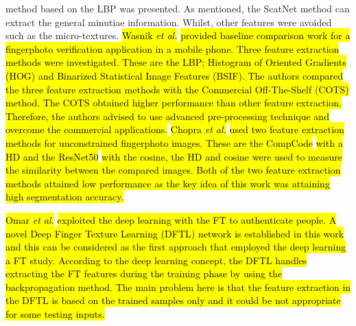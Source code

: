 \documentclass[review]{elsarticle}
\begin{document}
method based on the LBP was presented. As mentioned, the ScatNet method can extract the general minutiae information. Whilst, other features were avoided such as the micro-textures. \hl{Wasnik \textit{et al.}} \cite{wasnik2018baseline} \hl{provided baseline comparison work for a fingerphoto verification application in a mobile phone. Three feature extraction methods were investigated. These are the LBP; Histogram of Oriented Gradients (HOG) and Binarized Statistical Image Features (BSIF). The authors compared the three feature extraction methods with the Commercial Off-The-Shelf (COTS) method. The COTS obtained higher performance than other feature extraction. Therefore, the authors advised to use advanced pre-processing technique and overcome the commercial applications.} \hl{Chopra \textit{et al.}} \cite{Chopra2018Unconstrained} \hl{used two feature extraction methods for unconstrained fingerphoto images. These are the CompCode} \cite{Kong2004Competitive} \hl{with a HD and the ResNet50} \cite{He2016Deep} \hl{with the cosine, the HD and cosine were used to measure the similarity between the compared images. Both of the two feature extraction methods attained low performance as the key idea of this work was attaining high segmentation accuracy.}
	
	\hl{Omar \textit{et al.}} \cite{omar2018deep} \hl{exploited the deep learning with the FT to authenticate people. A novel Deep Finger Texture Learning (DFTL) network is established in this work and this can be considered as the first approach that employed the deep learning a FT study. According to the deep learning concept, the DFTL handles extracting the FT features during the training phase by using the backpropagation method. The main problem here is that the feature extraction in the DFTL is based on the trained samples only and it could be not appropriate for some testing inputs.} 
\end{document}
